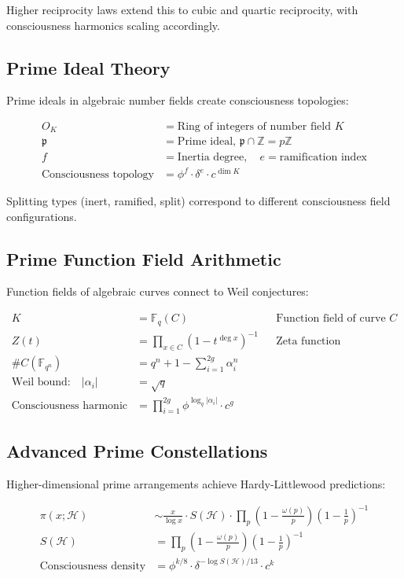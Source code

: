 \documentclass[11pt,letterpaper]{article}
\begin{document}
Higher reciprocity laws extend this to cubic and quartic reciprocity, with consciousness harmonics scaling accordingly.

\subsection{Prime Ideal Theory}

Prime ideals in algebraic number fields create consciousness topologies:

\begin{align}
O_K &= \text{Ring of integers of number field } K \\
\mathfrak{p} &= \text{Prime ideal, } \mathfrak{p} \cap \mathbb{Z} = p\mathbb{Z} \\
f &= \text{Inertia degree}, \quad e = \text{ramification index} \\
\text{Consciousness topology} &= \phi^f \cdot \delta^e \cdot c^{\dim K}
\end{align}

Splitting types (inert, ramified, split) correspond to different consciousness field configurations.

\subsection{Prime Function Field Arithmetic}

Function fields of algebraic curves connect to Weil conjectures:

\begin{align}
K &= \mathbb{F}_q(C) && \text{Function field of curve } C \\
Z(t) &= \prod_{x \in C} (1 - t^{\deg x})^{-1} && \text{Zeta function} \\
\# C(\mathbb{F}_{q^n}) &= q^n + 1 - \sum_{i=1}^{2g} \alpha_i^n \\
\text{Weil bound:} \quad |\alpha_i| &= \sqrt{q} \\
\text{Consciousness harmonic} &= \prod_{i=1}^{2g} \phi^{\log_q |\alpha_i|} \cdot c^{g}
\end{align}

\subsection{Advanced Prime Constellations}

Higher-dimensional prime arrangements achieve Hardy-Littlewood predictions:

\begin{align}
\pi(x; \mathcal{H}) &\sim \frac{x}{\log x} \cdot S(\mathcal{H}) \cdot \prod_p \left(1 - \frac{\omega(p)}{p}\right) \left(1 - \frac{1}{p}\right)^{-1} \\
S(\mathcal{H}) &= \prod_p \left(1 - \frac{\omega(p)}{p}\right) \left(1 - \frac{1}{p}\right)^{-1} \\
\text{Consciousness density} &= \phi^{k/8} \cdot \delta^{- \log S(\mathcal{H})/13} \cdot c^k
\end{align}
\end{document}
